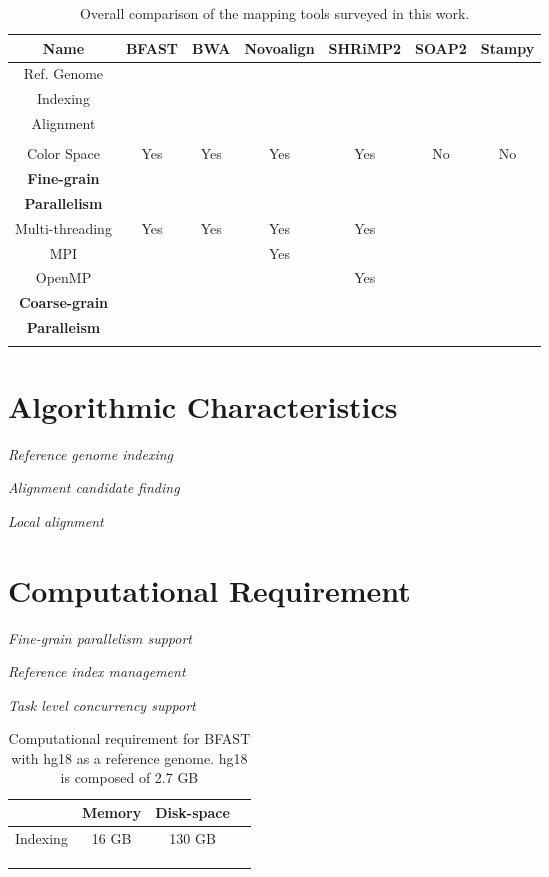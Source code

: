 \documentclass{sig-alternate}
\begin{document}
\begin{table}
 \tiny
\begin{tabular}{|c|c|c|c|c|c|c|} 
  \hline  Name & BFAST  & BWA & Novoalign & SHRiMP2  & SOAP2 & Stampy \\ 
\hline \hline

Ref. Genome  & & & & & & \\
Indexing & & & & & & \\ \hline
Alignment & & & & & & \\
 & & & & & \\ \hline
Color Space  & Yes & Yes & Yes & Yes & No & No\\ \hline
\textbf{Fine-grain} &  &  &  &  & & \\ 
 \textbf{Parallelism} & & & & & & \\
Multi-threading & Yes & Yes & Yes & Yes & &\\ 
MPI & & & Yes & & &\\
OpenMP &  & &  & Yes & &\\  \hline
\textbf{Coarse-grain}  & & & & & &\\ 
\textbf{Paralleism} & & & & & &\\
& & & & & &\\ \hline
\end{tabular} 
\caption{Overall comparison of the mapping tools surveyed in this work.}
 \label{global-comp} 
\end{table}


\section{Algorithmic Characteristics}
\textit{Reference genome indexing}



\textit{Alignment candidate finding}


\textit{Local alignment}



\section{Computational Requirement}
\textit{Fine-grain parallelism support}



\textit{Reference index management}


\textit{Task level concurrency support}






\begin{table}

\begin{tabular}{|c|c|c|c|}  \hline
  & Memory & Disk-space &  \\  \hline 
Indexing  & 16 GB & 130 GB &  \\
  & & &  \\ 
 & & &  \\
 & & &  \\ \hline

\end{tabular} 
\caption{Computational requirement for BFAST with hg18 as a reference genome.  hg18 is composed of 2.7 GB}
 \label{comp-req-bfast} 
\end{table}
\end{document}
